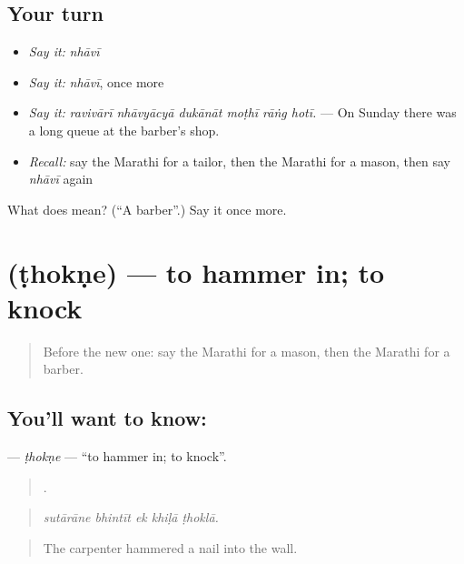 \subsection*{Your turn}
\begin{itemize}
\raggedright
  \item \emph{Say it:} \emph{nhāvī}
  \item \emph{Say it:} \emph{nhāvī}, once more
  \item \emph{Say it:} \emph{ravivārī nhāvyācyā dukānāt moṭhī rāṅg hotī.} — On Sunday there was a long queue at the barber's shop.
  \item \emph{Recall:} say the Marathi for a tailor, then the Marathi for a mason, then say \emph{nhāvī} again
\end{itemize}

\begin{tcolorbox}[breakable,colback=teal!4,colframe=teal!35!black,title={Before you move on}]
What does  mean? (\textquotedblleft{}A barber\textquotedblright{}.) Say it once more.
\end{tcolorbox}
\section[\texorpdfstring{\mr{ठोकणे} (ṭhokṇe)}{ठोकणे (ṭhokṇe)}]{ (ṭhokṇe) — to hammer in; to knock}

\label{lesson:MR-C504-thokne}



\begin{quote}
Before the new one: say the Marathi for a mason, then the Marathi for a barber.
\end{quote}

\subsection*{You'll want to know: }
\textbf{} — \emph{ṭhokṇe} — \textquotedblleft{}to hammer in; to knock\textquotedblright{}.

\begin{quote}
    .
\end{quote}

\begin{quote}
\emph{sutārāne bhintīt ek khiḷā ṭhoklā.}
\end{quote}

\begin{quote}
The carpenter hammered a nail into the wall.
\end{quote}

